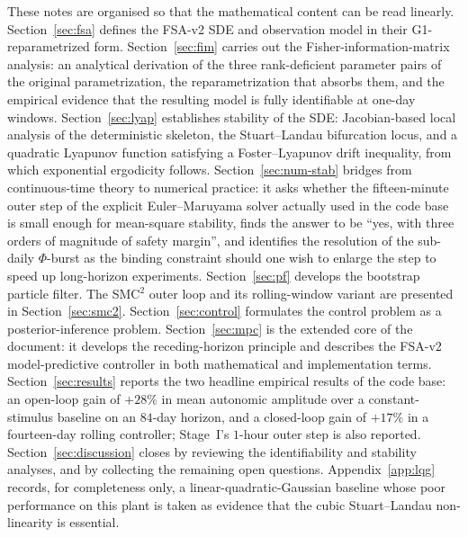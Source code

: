 These notes are organised so that the mathematical content can be read
linearly. Section~\ref{sec:fsa} defines the FSA-v2 SDE and observation
model in their G1-reparametrized form. Section~\ref{sec:fim} carries
out the Fisher-information-matrix analysis: an analytical derivation
of the three rank-deficient parameter pairs of the original
parametrization, the reparametrization that absorbs them, and the
empirical evidence that the resulting model is fully identifiable at
one-day windows. Section~\ref{sec:lyap} establishes stability of the
SDE: Jacobian-based local analysis of the deterministic skeleton, the
Stuart--Landau bifurcation locus, and a quadratic Lyapunov function
satisfying a Foster--Lyapunov drift inequality, from which exponential
ergodicity follows. Section~\ref{sec:num-stab} bridges from continuous-time
theory to numerical practice: it asks whether the fifteen-minute outer
step of the explicit Euler--Maruyama solver actually used in the code
base is small enough for mean-square stability, finds the answer to be
``yes, with three orders of magnitude of safety margin'', and identifies
the resolution of the sub-daily $\Phi$-burst as the binding constraint
should one wish to enlarge the step to speed up long-horizon experiments.
Section~\ref{sec:pf} develops the bootstrap
particle filter. The SMC${}^2$ outer loop and its rolling-window
variant are presented in Section~\ref{sec:smc2}.
Section~\ref{sec:control} formulates the control problem as a
posterior-inference problem. Section~\ref{sec:mpc} is the extended
core of the document: it develops the receding-horizon principle and
describes the FSA-v2 model-predictive controller in both mathematical
and implementation terms.
Section~\ref{sec:results} reports the two headline empirical results
of the code base: an open-loop gain of $+28\%$ in mean autonomic
amplitude over a constant-stimulus baseline on an $84$-day horizon,
and a closed-loop gain of $+17\%$ in a fourteen-day rolling
controller; Stage~I's $1$-hour outer step is also reported.
Section~\ref{sec:discussion} closes by reviewing the identifiability
and stability analyses, and by collecting the remaining open
questions. Appendix~\ref{app:lqg} records, for completeness only, a
linear-quadratic-Gaussian baseline whose poor performance on this
plant is taken as evidence that the cubic Stuart--Landau
non-linearity is essential.
